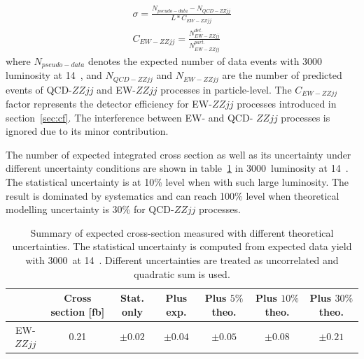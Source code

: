 \begin{equation}
\begin{split}
  \sigma = \frac{N_{pseudo-data} - N_{QCD-ZZjj}}{L*C_{EW-ZZjj}}\\
  C_{EW-ZZjj} = \frac{N_{EW-ZZjj}^{det.}}{N_{EW-ZZjj}^{part.}}
\end{split}
\end{equation}
where $N_{pseudo-data}$ denotes the expected number of data events with 3000~\ifb~ luminosity at 14~\tev,
and $N_{QCD-ZZjj}$ and $N_{EW-ZZjj}$ are the number of predicted events of QCD-$ZZjj$ and EW-$ZZjj$ processes in particle-level.
The $C_{EW-ZZjj}$ factor represents the detector efficiency for EW-$ZZjj$ processes introduced in section~\ref{sec:cf}.
The interference between EW- and QCD- $ZZjj$ processes is ignored due to its minor contribution.

The number of expected integrated cross section as well as its uncertainty under different uncertainty conditions are shown in table~\ref{tab:xsec}
in 3000~\ifb luminosity at 14~\tev.
The statistical uncertainty is at 10\% level when with such large luminosity.
The result is dominated by systematics and can reach 100\% level when theoretical modelling uncertainty is 30\% for QCD-$ZZjj$ processes.
\begin{table}[htbp]
  \small
  \centering
  \begin{tabular}{c|c|c|c|c|c|c}
    \hline
     & Cross section [fb] & Stat. only & Plus exp. & Plus $5\%$ theo. & Plus $10\%$ theo. & Plus $30\%$ theo. \\
    \hline
    EW-$ZZjj$ & 0.21 & $\pm0.02$ & $\pm0.04$ & $\pm0.05$ & $\pm 0.08$ & $\pm 0.21$ \\
    \hline
  \end{tabular}
  \caption{
  Summary of expected cross-section measured with different theoretical uncertainties.
  The statistical uncertainty is computed from expected data yield with 3000~\ifb at 14~\tev.
  Different uncertainties are treated as uncorrelated and quadratic sum is used.
  }
  \label{tab:xsec}
\end{table}

